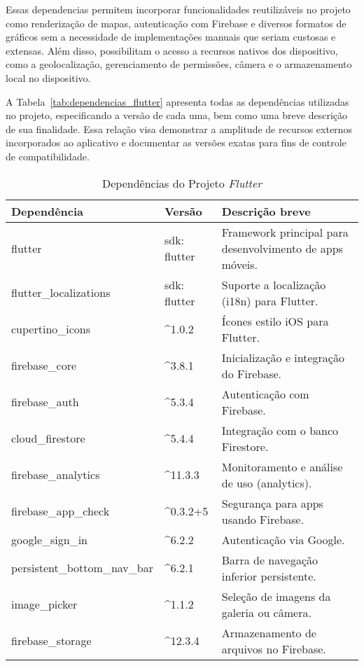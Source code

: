 Essas dependencias permitem incorporar funcionalidades reutilizáveis no projeto 
como renderização de mapas, autenticação com Firebase e diversos formatos de gráficos 
sem a necessidade de implementações manuais que seriam custosas e extensas. 
Além disso, possibilitam o acesso a recursos nativos dos dispositivo, como a 
geolocalização, gerenciamento de permissões, câmera e o armazenamento local no dispositivo.

A Tabela~\ref{tab:dependencias_flutter} apresenta todas as dependências utilizadas 
no projeto, especificando a versão de cada uma, bem como uma breve 
descrição de sua finalidade. Essa relação visa demonstrar a amplitude de recursos externos 
incorporados ao aplicativo e documentar as versões exatas para fins de controle de compatibilidade.

\begin{table}[H]
    \centering
    \caption{Dependências do Projeto \textit{Flutter}}
    \begin{tabular}{|p{4cm}|p{2.5cm}|p{8cm}|}
    \hline
    \textbf{Dependência} & \textbf{Versão} & \textbf{Descrição breve} \\ \hline
    flutter & sdk: flutter & Framework principal para desenvolvimento de apps móveis. \\ \hline
    flutter\_localizations & sdk: flutter & Suporte a localização (i18n) para Flutter. \\ \hline
    cupertino\_icons & \^{}1.0.2 & Ícones estilo iOS para Flutter. \\ \hline
    firebase\_core & \^{}3.8.1 & Inicialização e integração do Firebase. \\ \hline
    firebase\_auth & \^{}5.3.4 & Autenticação com Firebase. \\ \hline
    cloud\_firestore & \^{}5.4.4 & Integração com o banco Firestore. \\ \hline
    firebase\_analytics & \^{}11.3.3 & Monitoramento e análise de uso (analytics). \\ \hline
    firebase\_app\_check & \^{}0.3.2+5 & Segurança para apps usando Firebase. \\ \hline
    google\_sign\_in & \^{}6.2.2 & Autenticação via Google. \\ \hline
    persistent\_bottom\_nav\_bar & \^{}6.2.1 & Barra de navegação inferior persistente. \\ \hline
    image\_picker & \^{}1.1.2 & Seleção de imagens da galeria ou câmera. \\ \hline
    firebase\_storage & \^{}12.3.4 & Armazenamento de arquivos no Firebase. \\ \hline

\end{tabular}
\end{table}
